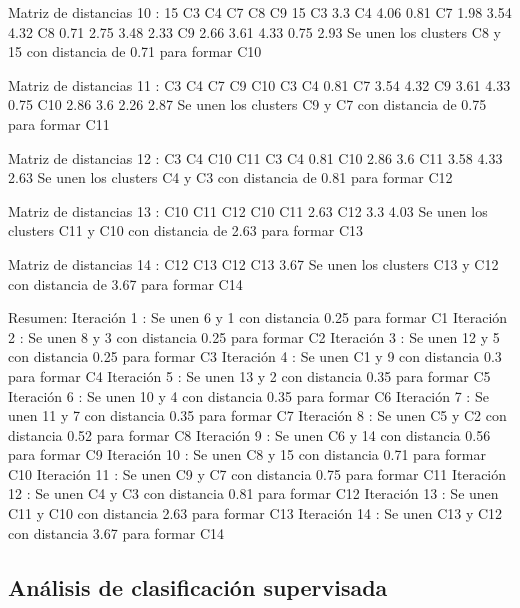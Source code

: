 \documentclass[a4paper, 12pt]{article}
\begin{document}
\begin{itemize}
\begin{Schunk}
\begin{Soutput}
Matriz de distancias 10 :
   15   C3   C4   C7   C8   C9
15                            
C3 3.3                        
C4 4.06 0.81                  
C7 1.98 3.54 4.32             
C8 0.71 2.75 3.48 2.33        
C9 2.66 3.61 4.33 0.75 2.93   
Se unen los clusters C8 y 15 con distancia de 0.71 para formar C10 

Matriz de distancias 11 :
    C3   C4   C7   C9   C10
C3                         
C4  0.81                   
C7  3.54 4.32              
C9  3.61 4.33 0.75         
C10 2.86 3.6  2.26 2.87    
Se unen los clusters C9 y C7 con distancia de 0.75 para formar C11 

Matriz de distancias 12 :
    C3   C4   C10  C11
C3                    
C4  0.81              
C10 2.86 3.6          
C11 3.58 4.33 2.63    
Se unen los clusters C4 y C3 con distancia de 0.81 para formar C12 

Matriz de distancias 13 :
    C10  C11  C12
C10              
C11 2.63         
C12 3.3  4.03    
Se unen los clusters C11 y C10 con distancia de 2.63 para formar C13 

Matriz de distancias 14 :
    C12  C13
C12         
C13 3.67    
Se unen los clusters C13 y C12 con distancia de 3.67 para formar C14 

Resumen:
Iteración 1 : Se unen 6 y 1 con distancia 0.25 para formar C1 
Iteración 2 : Se unen 8 y 3 con distancia 0.25 para formar C2 
Iteración 3 : Se unen 12 y 5 con distancia 0.25 para formar C3 
Iteración 4 : Se unen C1 y 9 con distancia 0.3 para formar C4 
Iteración 5 : Se unen 13 y 2 con distancia 0.35 para formar C5 
Iteración 6 : Se unen 10 y 4 con distancia 0.35 para formar C6 
Iteración 7 : Se unen 11 y 7 con distancia 0.35 para formar C7 
Iteración 8 : Se unen C5 y C2 con distancia 0.52 para formar C8 
Iteración 9 : Se unen C6 y 14 con distancia 0.56 para formar C9 
Iteración 10 : Se unen C8 y 15 con distancia 0.71 para formar C10 
Iteración 11 : Se unen C9 y C7 con distancia 0.75 para formar C11 
Iteración 12 : Se unen C4 y C3 con distancia 0.81 para formar C12 
Iteración 13 : Se unen C11 y C10 con distancia 2.63 para formar C13 
Iteración 14 : Se unen C13 y C12 con distancia 3.67 para formar C14 
\end{Soutput}
\end{Schunk}
		\end{itemize}
	
  \newpage
  
	\subsection{Análisis de clasificación supervisada}
	
\end{document}
